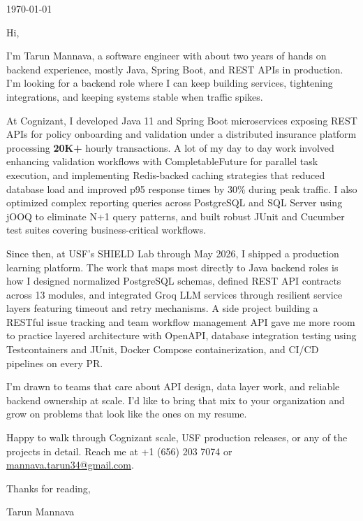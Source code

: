 




\coverLetterHeading

\vspace{14pt}
\noindent\today

\vspace{14pt}
\noindent Hi,

I'm Tarun Mannava, a software engineer with about two years of hands on backend experience, mostly Java, Spring Boot, and REST APIs in production. I'm looking for a backend role where I can keep building services, tightening integrations, and keeping systems stable when traffic spikes.

At Cognizant, I developed Java 11 and Spring Boot microservices exposing REST APIs for policy onboarding and validation under a distributed insurance platform processing \textbf{20K+} hourly transactions. A lot of my day to day work involved enhancing validation workflows with CompletableFuture for parallel task execution, and implementing Redis-backed caching strategies that reduced database load and improved p95 response times by 30\% during peak traffic. I also optimized complex reporting queries across PostgreSQL and SQL Server using jOOQ to eliminate N+1 query patterns, and built robust JUnit and Cucumber test suites covering business-critical workflows.

Since then, at USF's SHIELD Lab through May 2026, I shipped a production learning platform. The work that maps most directly to Java backend roles is how I designed normalized PostgreSQL schemas, defined REST API contracts across 13 modules, and integrated Groq LLM services through resilient service layers featuring timeout and retry mechanisms. A side project building a RESTful issue tracking and team workflow management API gave me more room to practice layered architecture with OpenAPI, database integration testing using Testcontainers and JUnit, Docker Compose containerization, and CI/CD pipelines on every PR.

I'm drawn to teams that care about API design, data layer work, and reliable backend ownership at scale. I'd like to bring that mix to your organization and grow on problems that look like the ones on my resume.

Happy to walk through Cognizant scale, USF production releases, or any of the projects in detail. Reach me at +1 (656) 203 7074 or \href{mailto:mannava.tarun34@gmail.com}{mannava.tarun34@gmail.com}.

Thanks for reading,

\noindent Tarun Mannava


